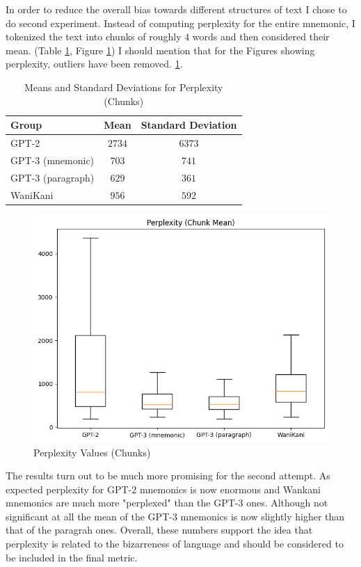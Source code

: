 In order to reduce the overall bias towards different structures of text I chose to do second experiment. Instead of computing perplexity for the entire mnemonic, I tokenized the text into chunks of roughly $4$ words and then considered their mean. (Table \ref{tab:ppl_4_chunks}, Figure \ref{figure:ppl_4_chunks}) I should mention that for the Figures showing perplexity, outliers have been removed.
\ref{figure:ppl_4_chunks}.     
\begin{table}[ht] 
\centering
\caption{Means and Standard Deviations for Perplexity (Chunks)}
\label{table:group_stats}
\begin{tabular}{lcc}
\toprule
Group & Mean & Standard Deviation \\
\midrule
GPT-2& $2734$ & $6373$ \\
GPT-3 (mnemonic) & $703$ & $741$ \\
GPT-3 (paragraph)& $629$ & $361$ \\
WaniKani & $956$ & $592$ \\
\bottomrule
\end{tabular}
\label{tab:ppl_4_chunks}
\end{table}
\begin{figure}
    \centering
    \includegraphics[width=400pt]{resources/ppl_4_chunks.png}
    \caption{Perplexity Values (Chunks)}
    \label{figure:ppl_4_chunks}
\end{figure}

The results turn out to be much more promising for the second attempt. As expected perplexity for GPT-2 mnemonics is now enormous and Wankani mnemonics are much more "perplexed" than the GPT-3 ones. Although not significant at all the mean of the GPT-3 mnemonics is now slightly higher than that of the paragrah ones. Overall, these numbers support the idea that perplexity is related to the bizarreness of language and should be considered to be included in the final metric. 





